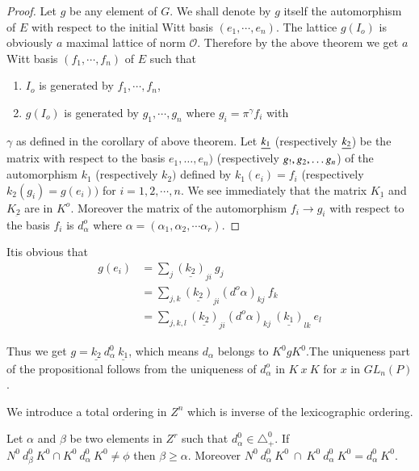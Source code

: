 \begin{proof}
  Let $g$ be any element of $G $. We shall denote by $g$ itself the
  automorphism of $E$ with respect to the initial Witt basis 
  $(e_1,\cdots, e_n)$. The lattice $ g(I_o)$ is obviously $a$ maximal
  lattice of norm $\mathscr{O}$.  Therefore by the above theorem we
  get $a$ Witt basis $(f_1, \cdots,  f_n )$ of $E$ such that  
  \begin{enumerate}[(1)]
  \item $I_o$ is generated by $ f_1,\cdots, f_n $,
  \item $ g(I_o)$ is generated by $ g_1,\cdots, g_n $ where $ g_i =
    \pi ^\gamma f_i $  with  
  \end{enumerate}
  $ \gamma $ as defined  in the corollary of above
  theorem. Let $\underline{k_1}$ (respectively $\underline{k_2}$) be
  the matrix with respect to the basis $e_1, \ldots, e_n)$
  (respectively $g_!, g_2,\break \ldots g_n$) of the
  automorphism $k_1$ (respectively $k_2) $ defined by $k_1(e_i)=f_i$
  (respectively $k_2(g_i)=g(e_i))$ for $i=1,2,\cdots, n$. We see
  immediately that the matrix $ K_{\underbar{1}}$ and $K_{\underbar
    {2}}$ are in $ K^o$. Moreover the matrix of the automorphism $f_i
  \rightarrow g_i$ with respect to the basis $f_i$  is $ d^o_\alpha $
  where $ \alpha  = (\alpha _1, \alpha _2, \cdots \alpha  _r)$. 
\end{proof} 

It\pageoriginale is obvious that
\begin{align*}
  g(e_i) & = \sum_j \underline{(k_2)}_{ji}~ g_j\\
  & = \sum_{j,k}\underline{(k_2)}_{ji} (d^{o}\alpha)_{kj} ~f_k\\
  & = \sum_{j,k,l}\underline{(k_2)}_{ji}(d^o\alpha)_{kj}~
  \underline{(k_1)}_{lk} ~ e_l 
\end{align*}

Thus we get $g = \underline{k_2}~ d^0_{\alpha} ~\underline{k_1}$,
which means $d_{\alpha}$ belongs to $K^0 g K^0$.The uniqueness part of
the propositional follows from the uniqueness of $d^o_\alpha$ in $K
~x~ K $ for $x$ in $GL_n(P)$. 

We introduce a total ordering in $Z^n$ which is inverse of the
lexicographic ordering. 

\begin{proposition}\label{part2:chap2:sec3:prop7}%
  Let $\alpha$ and $\beta$ be two elements in $Z^r$ such that
  $d^0_{\alpha}\in \triangle^0_+$. If $N^0~d^0_{\beta}~K^0\cap
  K^0~d^0_{\alpha}~K^0 \neq \phi$ then $\beta \geq \alpha$. Moreover
  $N^0~d^0_\alpha ~ K^0 ~\cap~ K^0~ d^0_\alpha ~ K^0 = d^0_\alpha ~
  K^0$. 
\end{proposition}

